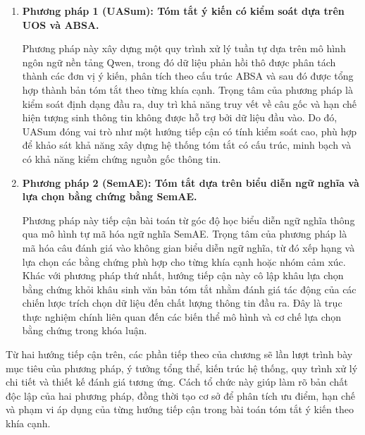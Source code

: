 \begin{enumerate}[leftmargin=1.2cm]
    \item \textbf{Phương pháp 1 (UASum): Tóm tắt ý kiến có kiểm soát dựa trên UOS và ABSA.}

    Phương pháp này xây dựng một quy trình xử lý tuần tự dựa trên mô hình ngôn ngữ nền tảng Qwen, trong đó dữ liệu phản hồi thô được phân tách thành các đơn vị ý kiến, phân tích theo cấu trúc ABSA và sau đó được tổng hợp thành bản tóm tắt theo từng khía cạnh. Trọng tâm của phương pháp là kiểm soát định dạng đầu ra, duy trì khả năng truy vết về câu gốc và hạn chế hiện tượng sinh thông tin không được hỗ trợ bởi dữ liệu đầu vào. Do đó, UASum đóng vai trò như một hướng tiếp cận có tính kiểm soát cao, phù hợp để khảo sát khả năng xây dựng hệ thống tóm tắt có cấu trúc, minh bạch và có khả năng kiểm chứng nguồn gốc thông tin.

    \item \textbf{Phương pháp 2 (SemAE): Tóm tắt dựa trên biểu diễn ngữ nghĩa và lựa chọn bằng chứng bằng SemAE.}

    Phương pháp này tiếp cận bài toán từ góc độ học biểu diễn ngữ nghĩa thông qua mô hình tự mã hóa ngữ nghĩa SemAE. Trọng tâm của phương pháp là mã hóa câu đánh giá vào không gian biểu diễn ngữ nghĩa, từ đó xếp hạng và lựa chọn các bằng chứng phù hợp cho từng khía cạnh hoặc nhóm cảm xúc. Khác với phương pháp thứ nhất, hướng tiếp cận này cô lập khâu lựa chọn bằng chứng khỏi khâu sinh văn bản tóm tắt nhằm đánh giá tác động của các chiến lược trích chọn dữ liệu đến chất lượng thông tin đầu ra. Đây là trục thực nghiệm chính liên quan đến các biến thể mô hình và cơ chế lựa chọn bằng chứng trong khóa luận.
\end{enumerate}

Từ hai hướng tiếp cận trên, các phần tiếp theo của chương sẽ lần lượt trình bày mục tiêu của phương pháp, ý tưởng tổng thể, kiến trúc hệ thống, quy trình xử lý chi tiết và thiết kế đánh giá tương ứng. Cách tổ chức này giúp làm rõ bản chất độc lập của hai phương pháp, đồng thời tạo cơ sở để phân tích ưu điểm, hạn chế và phạm vi áp dụng của từng hướng tiếp cận trong bài toán tóm tắt ý kiến theo khía cạnh.





